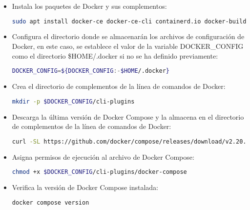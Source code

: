 \begin{itemize}
		\item Instala los paquetes de Docker y sus complementos:
			\begin{lstlisting}[language=Bash, caption=docker compose]
			sudo apt install docker-ce docker-ce-cli containerd.io docker-buildx-plugin docker-compose-plugin
			\end{lstlisting}
	
		\item Configura el directorio donde se almacenarán los archivos de configuración de Docker, en este caso, se establece el valor de la variable DOCKER\_CONFIG como el directorio \$HOME/.docker si no se ha definido previamente:
	
			\begin{lstlisting}[language=Bash, caption=variable]
			DOCKER_CONFIG=${DOCKER_CONFIG:-$HOME/.docker}
			\end{lstlisting}
		
		\item Crea el directorio de complementos de la línea de comandos de Docker:
			\begin{lstlisting}[language=Bash, caption=directorio]
			mkdir -p $DOCKER_CONFIG/cli-plugins
			\end{lstlisting}
		
		\item Descarga la última versión de Docker Compose y la almacena en el directorio de complementos de la línea de comandos de Docker:
		
			\begin{lstlisting}[language=Bash, caption=descargar]
			curl -SL https://github.com/docker/compose/releases/download/v2.20.0/docker-compose-linux-x86_64 -o $DOCKER_CONFIG/cli-plugins/docker-compose
			\end{lstlisting}
	
		\item Asigna permisos de ejecución al archivo de Docker Compose:
			
			\begin{lstlisting}[language=Bash, caption=permisos de ejecución]
			chmod +x $DOCKER_CONFIG/cli-plugins/docker-compose
			\end{lstlisting}
		
		\item Verifica la versión de Docker Compose instalada:
			\begin{lstlisting}[language=Bash, caption=version]
			docker compose version
			\end{lstlisting}

		\end{itemize}
		
